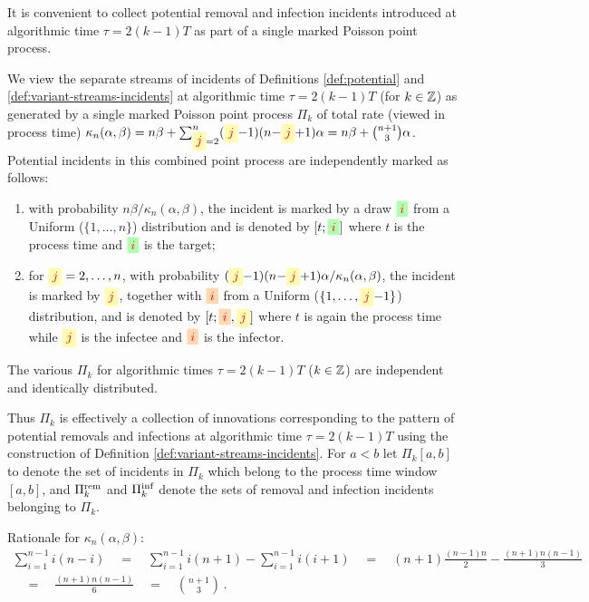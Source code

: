 \documentclass[]{article}
\newcommand{\Poisson}{\Pi}
\newcommand{\PoissonRem}{\Poisson^\textup{rem}}
\newcommand{\PoissonInf}{\Poisson^\textup{inf}}
\newcommand{\target}{{\colorbox{green!30}{$\textcolor{red}{i}$}}}
\newcommand{\infectee}{{\colorbox{yellow!30}{$\textcolor{red}{j}$}}}
\newcommand{\infector}{{\colorbox{orange!30}{$\textcolor{red}{i}$}}}
\begin{document}
It is convenient to collect
potential removal and infection incidents introduced
at algorithmic time \(\tau=2(k{-}1)T\) as part of a single marked Poisson point process.
\begin{defn}
We view the separate streams of incidents 
\label{def:variant-streams-incidents2}
of Definitions \ref{def:potential} and \ref{def:variant-streams-incidents}
at algorithmic time \(\tau=2(k{-}1)T\) (for \(k\in\mathbb{Z}\))
as generated by
a single 
marked Poisson point process \(\Poisson_k\)
of total rate
(viewed in process time)
\(\kappa_{n}(\alpha,\beta)=n\beta + 
\sum_{\infectee=2}^{n}(\infectee{-}1)(n{-}\infectee{+}1)\alpha=n\beta + \tbinom{n+1}{3}\alpha\).
Potential incidents in this combined point process
are independently marked as follows:
\begin{enumerate}[1:]
\item 
with probability \(n\beta/\kappa_{n}(\alpha,\beta)\),
the incident is marked
by a draw \(\target\) from a Uniform (\(\{1, \ldots, n\}\))
distribution and 
is denoted by \([t;\target]\) where \(t\) is the process time 
and \(\target\) is the target;
\item
for \(\infectee=2, \ldots, n\),
with probability 
\((\infectee{-}1)(n{-}\infectee{+}1)\alpha/\kappa_{n}(\alpha,\beta)\),
the incident is marked
by \(\infectee\), together with \(\infector\)
from a Uniform (\(\{1, \ldots, \infectee{-}1\}\)) distribution,
and is denoted by \([t;\infector,\infectee]\) where \(t\) is
again the process time while \(\infectee\) is the infectee and \(\infector\) is the infector.
\end{enumerate}
The various \(\Poisson_k\) for algorithmic times \(\tau=2(k{-}1)T\) (\(k\in\mathbb{Z}\))
are independent and identically distributed.
\end{defn}

Thus \(\Poisson_k\) is effectively a 
collection of innovations
corresponding to 
the pattern of
potential removals and infections
at algorithmic time \(\tau=2(k{-}1)T\)
using the construction of 
Definition \ref{def:variant-streams-incidents}. 
For \(a<b\) let \(\Poisson_k[a,b]\) 
to denote the set of incidents in \(\Poisson_k\)
which belong to the process time window \([a,b]\), 
and \(\PoissonRem_k\) and \(\PoissonInf_k\) 
denote the sets of removal and infection incidents belonging to \(\Poisson_k\).
\begin{NoteThis2}
Rationale for \(\kappa_n(\alpha,\beta)\):
\begin{multline*}
\sum_{i=1}^{n-1} i(n-i)\quad=\quad
\sum_{i=1}^{n-1} i(n+1) -\sum_{i=1}^{n-1} i(i+1)
\quad=\quad
(n+1)\frac{(n-1)n}{2}
- \frac{(n+1)n(n-1)}{3} 
\\
\quad=\quad
\frac{(n+1)n(n-1)}{6}
\quad=\quad
\binom{n+1}{3}\,.
\end{multline*}
\end{NoteThis2}
\end{document}
